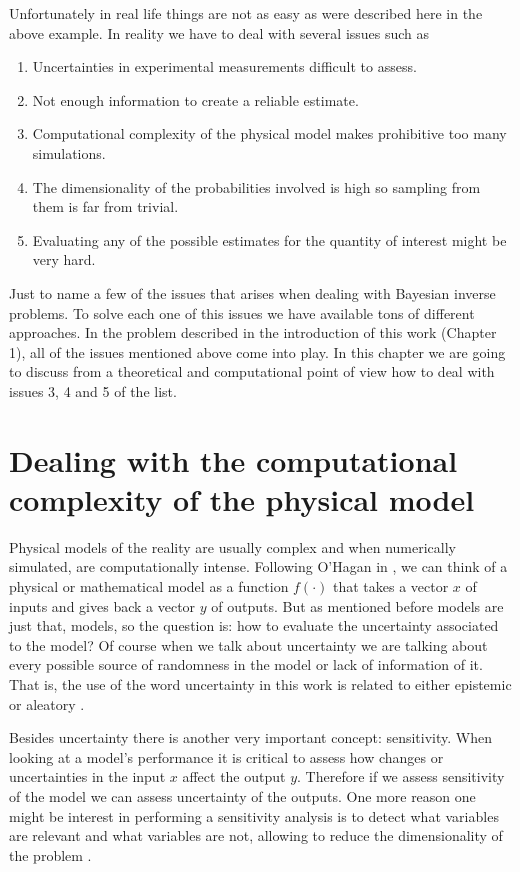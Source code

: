 \documentclass[12pt]{book}
\begin{document}
Unfortunately in real life things are not as easy as  were described here in the above example. 
In reality we have to deal with several issues such as
\begin{enumerate}
\item Uncertainties in experimental measurements difficult to assess.
\item Not enough information to create a reliable estimate.
\item Computational complexity of the physical model makes prohibitive too many simulations.
\item The dimensionality of the probabilities involved is high so sampling from them is far from trivial.
\item Evaluating any of the possible estimates for the quantity of interest might be very hard.
\end{enumerate}
Just to name a few of the issues that arises when dealing with Bayesian inverse problems. To solve each
one of this issues we have available tons of different approaches. In the problem described in the 
introduction of this work (Chapter 1), all of the issues mentioned above come into play. In this chapter we are
going to discuss from a theoretical and computational point of view how to deal with issues 
3, 4 and 5 of the list.


\section{Dealing with  the computational complexity of the physical model}
Physical models of the reality are usually complex and when numerically simulated, are computationally intense.
Following O'Hagan in \cite{o2006bayesian}, we can think of a physical or mathematical model as a function
$f(\cdot)$ that takes a vector $x$ of inputs and gives back a vector $y$ of outputs. But as mentioned before 
models are just that, models, so the question is: how to evaluate the uncertainty associated to the model? 
Of course when we talk about uncertainty we are talking about every possible source of randomness in the 
model or  lack of information of it. That is, the use of the word uncertainty in this work
 is related to either
epistemic or aleatory \cite{kennedy2001bayesian}.
\newline

Besides uncertainty there is another very important concept: sensitivity. When looking at a  model's performance
it is critical to assess how changes or uncertainties 
 in the input $x$ affect the output $y$. Therefore if we assess sensitivity
of the model we can assess uncertainty of the outputs. One more reason one might be interest in performing
a sensitivity analysis is to detect what variables are relevant and what variables are not, allowing to reduce
the dimensionality of the problem .
\end{document}
